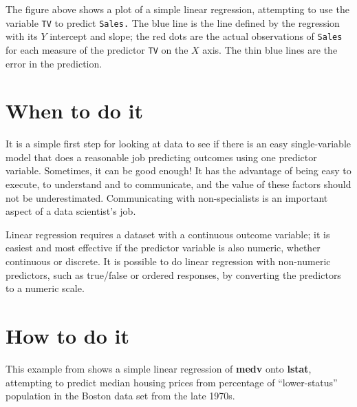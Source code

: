 \documentclass[
]{book}
\newenvironment{Shaded}{\begin{snugshade}}{\end{snugshade}}
\newcommand{\AttributeTok}[1]{\textcolor[rgb]{0.77,0.63,0.00}{#1}}
\newcommand{\DecValTok}[1]{\textcolor[rgb]{0.00,0.00,0.81}{#1}}
\newcommand{\FunctionTok}[1]{\textcolor[rgb]{0.00,0.00,0.00}{#1}}
\newcommand{\NormalTok}[1]{#1}
\newcommand{\OtherTok}[1]{\textcolor[rgb]{0.56,0.35,0.01}{#1}}
\newcommand{\SpecialCharTok}[1]{\textcolor[rgb]{0.00,0.00,0.00}{#1}}
\newcommand{\StringTok}[1]{\textcolor[rgb]{0.31,0.60,0.02}{#1}}
\begin{document}
The figure above shows a plot of a simple linear regression, attempting to use the variable \texttt{TV} to predict \texttt{Sales.} The blue line is the line defined by the regression with its \(Y\) intercept and slope; the red dots are the actual observations of \texttt{Sales} for each measure of the predictor \texttt{TV} on the \(X\) axis. The thin blue lines are the error in the prediction.

\hypertarget{when-to-do-it}{%
\section{When to do it}\label{when-to-do-it}}

It is a simple first step for looking at data to see if there is an easy single-variable model that does a reasonable job predicting outcomes using one predictor variable. Sometimes, it can be good enough! It has the advantage of being easy to execute, to understand and to communicate, and the value of these factors should not be underestimated. Communicating with non-specialists is an important aspect of a data scientist's job.

Linear regression requires a dataset with a continuous outcome variable; it is easiest and most effective if the predictor variable is also numeric, whether continuous or discrete. It is possible to do linear regression with non-numeric predictors, such as true/false or ordered responses, by converting the predictors to a numeric scale.

\hypertarget{how-to-do-it}{%
\section{How to do it}\label{how-to-do-it}}

This example from \citet{ISLR} shows a simple linear regression of \textbf{medv} onto \textbf{lstat}, attempting to predict median housing prices from percentage of ``lower-status'' population in the Boston data set from the late 1970s.

\begin{Shaded}
\end{Shaded}
\end{document}
